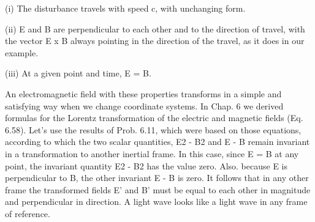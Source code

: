 (i) The disturbance travels with speed c, with unchanging
form. 

(ii) E and B are perpendicular to each other and to the direction
of travel, with the vector E x B always pointing in the
direction of the travel, as it does in our example.

(iii) At a given point and time, E = B.

An electromagnetic field with these properties transforms in a
simple and satisfying way when we change coordinate systems. In
Chap. 6 we derived formulas for the Lorentz transformation of the
electric and magnetic fields (Eq. 6.58). Let's use the results of
Prob. 6.11, which were based on those equations, according to which
the two scalar quantities, E2 - B2 and E - B remain invariant in a
transformation to another inertial frame. In this case, since E = B
at any point, the invariant quantity E2 - B2 has the value zero. Also.
because E is perpendicular to B, the other invariant E - B is zero. It
follows that in any other frame the transformed fields E' and B' must
be equal to each other in magnitude and perpendicular in direction.
A light wave looks like a light wave in any frame of reference.

\fi
